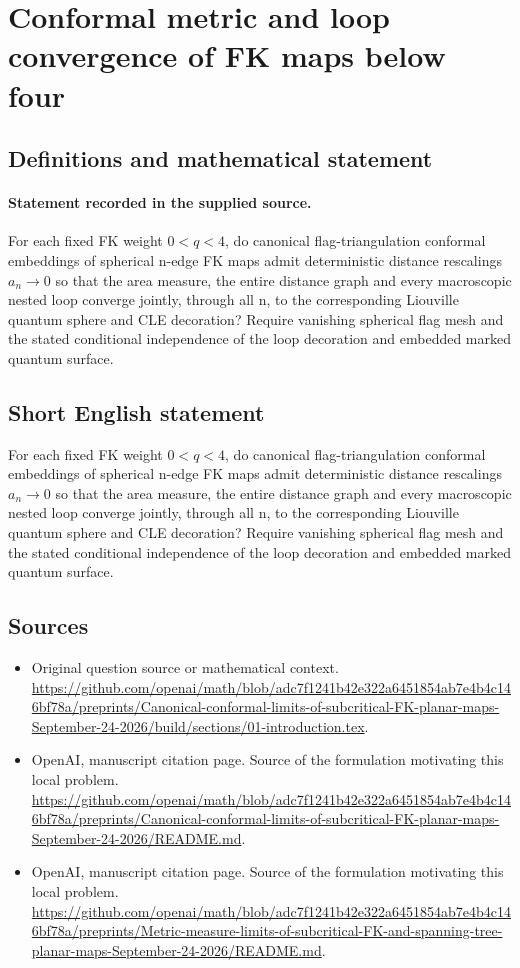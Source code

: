 \documentclass[11pt]{article}
\begin{document}
\section*{Conformal metric and loop convergence of FK maps below four}\label{statement}
\subsection{Definitions and mathematical statement}
\paragraph{Statement recorded in the supplied source.}
For each fixed FK weight $0<q<4$, do canonical flag-triangulation conformal embeddings of spherical n-edge FK maps admit deterministic distance rescalings $a_n\to 0$ so that the area measure, the entire distance graph and every macroscopic nested loop converge jointly, through all n, to the corresponding Liouville quantum sphere and CLE decoration? Require vanishing spherical flag mesh and the stated conditional independence of the loop decoration and embedded marked quantum surface.
\subsection{Short English statement}
For each fixed FK weight $0<q<4$, do canonical flag-triangulation conformal embeddings of spherical n-edge FK maps admit deterministic distance rescalings $a_n\to 0$ so that the area measure, the entire distance graph and every macroscopic nested loop converge jointly, through all n, to the corresponding Liouville quantum sphere and CLE decoration? Require vanishing spherical flag mesh and the stated conditional independence of the loop decoration and embedded marked quantum surface.
\subsection{Sources}
\begin{itemize}
\item[S1] Original question source or mathematical context.
\url{https://github.com/openai/math/blob/adc7f1241b42e322a6451854ab7e4b4c146bf78a/preprints/Canonical-conformal-limits-of-subcritical-FK-planar-maps-September-24-2026/build/sections/01-introduction.tex}.
\item[S2] OpenAI, manuscript citation page. Source of the formulation motivating this local problem.
\url{https://github.com/openai/math/blob/adc7f1241b42e322a6451854ab7e4b4c146bf78a/preprints/Canonical-conformal-limits-of-subcritical-FK-planar-maps-September-24-2026/README.md}.
\item[S3] OpenAI, manuscript citation page. Source of the formulation motivating this local problem.
\url{https://github.com/openai/math/blob/adc7f1241b42e322a6451854ab7e4b4c146bf78a/preprints/Metric-measure-limits-of-subcritical-FK-and-spanning-tree-planar-maps-September-24-2026/README.md}.
\end{itemize}
\end{document}

